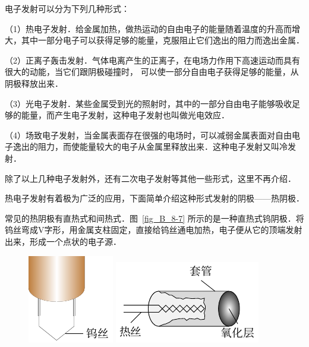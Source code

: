 电子发射可以分为下列几种形式：

（1）热电子发射．给金属加热，做热运动的自由电子的能量随着温度的升高而增大，其中一部分电子可以获得足够的能量，克服阻止它们逸出的阻力而逸出金属．

（2）正离子轰击发射．气体电离产生的正离子，在电场力作用下高速运动而具有很大的动能，当它们跟阴极碰撞时，
可以使一部分自由电子获得足够的能量，从阴极释放出来．

（3）光电子发射．某些金属受到光的照射时，其中的一部分自由电子能够吸收足够的能量，而产生电子发射，这种电子发射也叫做光电效应．

（4）场致电子发射，当金属表面存在很强的电场时，可以减弱金属表面对自由电子逸出的阻力，而使能量较大的电子从金属里释放出来．这种电子发射又叫冷发射．

除了以上几种电子发射外，还有二次电子发射等其他一些形式，这里不再介绍．

热电子发射有着极为广泛的应用，下面简单介绍这种形式发射的阴极——热阴极．

常见的热阴极有直热式和间热式．图~\ref{fig_B_8-7} 所示的是一种直热式钨阴极．将钨丝弯成V字形，用金属支柱固定，直接给钨丝通电加热，电子便从它的顶端发射出来，形成一个点状的电子源．
\begin{figure}[htbp]
    \centering
    \begin{minipage}[t]{0.48\textwidth}
        \centering
        \includegraphics{fig/B/8-7.pdf}
        \caption{}\label{fig_B_8-8}
    \end{minipage}
    \begin{minipage}[t]{0.48\textwidth}
        \centering
        \includegraphics{fig/B/8-8.pdf}
        \caption{}\label{fig_B_8-8}
    \end{minipage}
\end{figure}

